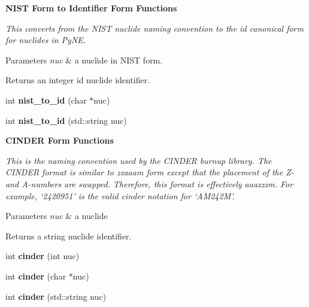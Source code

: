 \begin{Indent}{\bf N\+I\+S\+T Form to Identifier Form Functions}\par
{\em This converts from the N\+I\+S\+T nuclide naming convention to the id canonical form for nuclides in Py\+N\+E. 
\begin{DoxyParams}{Parameters}
{\em nuc} & a nuclide in N\+I\+S\+T form. \\
\hline
\end{DoxyParams}
\begin{DoxyReturn}{Returns}
an integer id nuclide identifier. 
\end{DoxyReturn}
}\begin{DoxyCompactItemize}
\item 
\hypertarget{namespacepyne_1_1nucname_a2ca1363f775916188e495d5571aaa222}{int {\bfseries nist\+\_\+to\+\_\+id} (char $\ast$nuc)}\label{namespacepyne_1_1nucname_a2ca1363f775916188e495d5571aaa222}

\item 
\hypertarget{namespacepyne_1_1nucname_a7ef9fe9b42d5ac9063aab9a649e8dabd}{int {\bfseries nist\+\_\+to\+\_\+id} (std\+::string nuc)}\label{namespacepyne_1_1nucname_a7ef9fe9b42d5ac9063aab9a649e8dabd}

\end{DoxyCompactItemize}
\end{Indent}
\begin{Indent}{\bf C\+I\+N\+D\+E\+R Form Functions}\par
{\em This is the naming convention used by the C\+I\+N\+D\+E\+R burnup library. The C\+I\+N\+D\+E\+R format is similar to zzaaam form except that the placement of the Z-\/ and A-\/numbers are swapped. Therefore, this format is effectively aaazzzm. For example, ‘2420951’ is the valid cinder notation for ‘\+A\+M242\+M’. 
\begin{DoxyParams}{Parameters}
{\em nuc} & a nuclide \\
\hline
\end{DoxyParams}
\begin{DoxyReturn}{Returns}
a string nuclide identifier. 
\end{DoxyReturn}
}\begin{DoxyCompactItemize}
\item 
\hypertarget{namespacepyne_1_1nucname_a72e7d4ad5fb78e4d0f63c3aa4acfbf52}{int {\bfseries cinder} (int nuc)}\label{namespacepyne_1_1nucname_a72e7d4ad5fb78e4d0f63c3aa4acfbf52}

\item 
\hypertarget{namespacepyne_1_1nucname_ab0bbfbc860c6ad54c2e89412965347cd}{int {\bfseries cinder} (char $\ast$nuc)}\label{namespacepyne_1_1nucname_ab0bbfbc860c6ad54c2e89412965347cd}

\item 
\hypertarget{namespacepyne_1_1nucname_ade4d33508b97fd38dcca937e366f324e}{int {\bfseries cinder} (std\+::string nuc)}\label{namespacepyne_1_1nucname_ade4d33508b97fd38dcca937e366f324e}

\end{DoxyCompactItemize}
\end{Indent}
